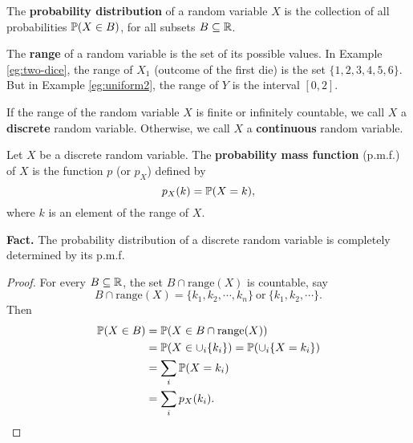   \begin{definition}
    The \textbf{probability distribution} of a random variable $X$ is the
    collection of all probabilities $\mathbb{P}(X\in B)$, for all subsets $B\subseteq \mathbb{R}$.
  \end{definition}
  The \textbf{range} of a random variable is the set of its possible values. In
  Example \ref{eg:two-dice}, the range of $X_1$ (outcome of the first die) is
  the set $\{1,2,3,4,5,6\}$. But in Example \ref{eg:uniform2}, the range of $Y$
  is the interval $[0,2]$.
  \begin{definition}
   If the range of the random variable $X$ is finite or infinitely countable, we
   call $X$ a \textbf{discrete} random variable. Otherwise, we call $X$ a
   \textbf{continuous} random variable.
  \end{definition}
  \begin{definition}
    Let $X$ be a discrete random variable. The \textbf{probability mass
      function} (p.m.f.) of $X$ is the function $p$ (or $p_X$) defined by
    \[
      p_X(k) = \mathbb{P}(X = k),
    \]
    where $k$ is an element of the range of $X$.
  \end{definition}
   \textbf{Fact.} The probability distribution of a discrete random variable is
  completely determined by its p.m.f.
  \begin{proof}
    For every $B\subseteq \mathbb{R}$, the set $B\cap\text{range}(X)$ is countable, say
    \[
      B\cap\text{range}(X) = \{k_1,k_2,\cdots,k_n\}~\text{or}~\{k_1,k_2,\cdots\}.
    \]
    Then
    \begin{align*}
      \mathbb{P}(X\in B) & =
                    \mathbb{P}(X\in B\cap\text{range}(X))\\
                  & = \mathbb{P}(X\in \cup_i \{k_i\}) = \mathbb{P}(\cup_i \{X = k_i\})\\
                  & = \sum_i \mathbb{P}(X = k_i)\\
      & = \sum_ip_X(k_i).
    \end{align*}
  \end{proof}
 
